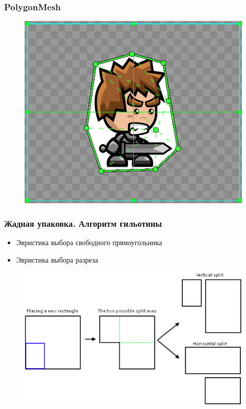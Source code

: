 \documentclass[10pt, unicode]{beamer}
\begin{document}
    \begin{frame}
        \frametitle{PolygonMesh}
        \begin{figure}[H]
            \centering
            \includegraphics[scale=0.8]{PGMW.png}
        \end{figure}
    \end{frame}
    \begin{frame}
        \frametitle{Жадная упаковка. Алгоритм гильотины}
        \begin{itemize}
            \item Эвристика выбора свободного прямоугольника
            \item Эвристика выбора разреза
        \end{itemize}
        \begin{figure}[H]
            \centering
            \includegraphics[width=\linewidth, keepaspectratio]{Guillotine.png}
        \end{figure}
    \end{frame}
\end{document}
